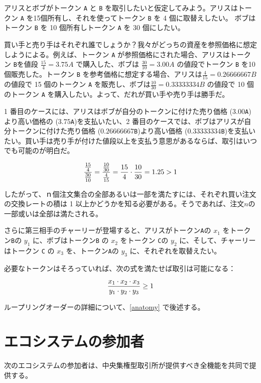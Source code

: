 \documentclass{article}
\begin{document}
\begin{multicols}{2}
アリスとボブがトークン \verb|A| と \verb|B| を取引したいと仮定してみよう。アリスはトークン \verb|A| を15個所有し、それを使ってトークン \verb|B| を 4 個に取替えしたい。 ボブはトークン \verb|B| を 10 個所有しトークン \verb|A| を 30 個にしたい。

買い手と売り手はそれぞれ誰でしょうか？我々がどっちの資産を参照価格に想定しようによる。例えば、トークン \verb|A| が参照価格にされた場合、アリスはトークン \verb|B|を値段 $\displaystyle \frac{15}{4}=3.75A$ で購入した、ボブは $\displaystyle \frac{30}{10} = 3.00A$ の値段でトークン \verb|B| を10個販売した。トークン \verb|B| を参考価格に想定する場合、アリスは$\displaystyle \frac{4}{15} = 0.26666667B$の値段で 15 個のトークン \verb|A| を販売し、ボブは$\displaystyle \frac{10}{30} = 0.33333334B$ の値段で 10 個のトークン \verb|A| を購入したい。よって、だれが買い手や売り手は勝手だ。

1 番目のケースには、アリスはボブが自分のトークンに付けた売り価格 ($3.00$\verb|A|)より高い価格の ($3.75$\verb|A|)を支払いたい、2 番目のケースでは、ボブはアリスが自分トークンに付けた売り価格 ($0.26666667$\verb|B|)より高い価格 ($0.33333334$\verb|B|)を支払いたい。買い手は売り手が付けた値段以上を支払う意思があるならば、取引はいつでも可能のが明白だ。

\begin{equation}
{{15\over 4} \over {30\over 10}} = {{10\over 30} \over {4\over 15}}={15 \over 4} \cdot {10 \over 30} = 1.25 > 1
\end{equation}
  
したがって、$ｎ$個注文集合の全部あるいは一部を満たすには、それぞれ買い注文の交換レートの積は 1 以上かどうかを知る必要がある。そうであれば、注文$n$の一部或いは全部は満たされる\cite{supersymmetry}。

さらに第三相手のチャーリーが登場すると、アリスがトークン\verb|A|の $x_{1}$ をトークン\verb|B|の $y_{1}$ に、ボブはトークン\verb|B| の $x_{2}$ をトークン \verb|C|の $y_{2}$ に、そして、チャーリーはトークン \verb|C| の $x_{3}$ を、トークン\verb|A|の $y_{3}$ に、それぞれを取替えたい。

必要なトークンはそろっていれば、次の式を満たせば取引は可能になる：

\begin{equation}
{{x_1 \cdot x_2 \cdot x_3 \over y_1 \cdot y_2 \cdot y_3} \geq 1}
\end{equation}

ループリングオーダーの詳細について、\ref{anatomy} で後述する。


\section{エコシステムの参加者\label{sec:ecosystem}}
次のエコシステムの参加者は、中央集権型取引所が提供すべき全機能を共同で提供する。


\end{multicols}
\end{document}
